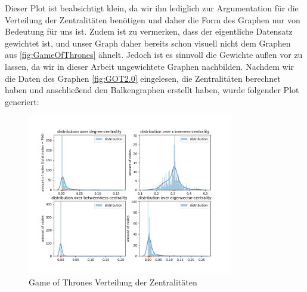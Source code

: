 Dieser Plot ist beabsichtigt klein, da wir ihn lediglich zur Argumentation für die Verteilung der Zentralitäten benötigen und daher die Form des Graphen nur von Bedeutung für uns ist. Zudem ist zu vermerken, dass der eigentliche Datensatz gewichtet ist, und unser Graph daher bereits schon visuell nicht dem Graphen aus \ref{fig:GameOfThrones} ähnelt. Jedoch ist es sinnvoll die Gewichte außen vor zu lassen, da wir in dieser Arbeit ungewichtete Graphen nachbilden. Nachdem wir die Daten des Graphen \ref{fig:GOT2.0} eingelesen, die Zentralitäten berechnet haben und anschließend den Balkengraphen erstellt haben, wurde folgender Plot generiert:

\FloatBarrier
\begin{figure}[h!]%
  \centering
   \includegraphics[width=0.8\textwidth]{Graphics/GOTdistribution.png}
  \caption{Game of Thrones Verteilung der Zentralitäten}
  \label{fig:distributionGOT}
\end{figure}
\FloatBarrier
 
